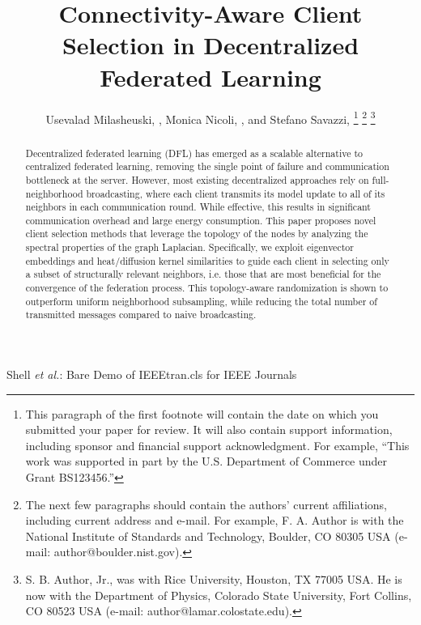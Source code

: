 \documentclass[journal]{IEEEtran}
\begin{document}
\title{Connectivity-Aware Client Selection in Decentralized Federated Learning}

\author{Usevalad Milasheuski, , Monica Nicoli, , and Stefano Savazzi, 
\thanks{This paragraph of the first footnote will contain the date on which you submitted your paper for review. It will also contain support information, including sponsor and financial support acknowledgment. For example, ``This work was supported in part by the U.S. Department of Commerce under Grant BS123456.'' }
\thanks{The next few paragraphs should contain the authors' current affiliations, including current address and e-mail. For example, F. A. Author is with the National Institute of Standards and Technology, Boulder, CO 80305 USA (e-mail: author@boulder.nist.gov).}
\thanks{S. B. Author, Jr., was with Rice University, Houston, TX 77005 USA. He is now with the Department of Physics, Colorado State University, Fort Collins, CO 80523 USA (e-mail: author@lamar.colostate.edu).}}

{Shell \MakeLowercase{\textit{et al.}}: Bare Demo of IEEEtran.cls for IEEE Journals}
\maketitle

\begin{abstract}
Decentralized federated learning (DFL) has emerged as a scalable alternative to centralized federated learning, removing the single point of failure and communication bottleneck at the server. However, most existing decentralized approaches rely on full-neighborhood broadcasting, where each client transmits its model update to all of its neighbors in each communication round. While effective, this results in significant communication overhead and large energy consumption. This paper proposes novel client selection methods that leverage the topology of the nodes by analyzing the spectral properties of the graph Laplacian. Specifically, we exploit eigenvector embeddings and heat/diffusion kernel similarities to guide each client in selecting only a subset of structurally relevant neighbors, i.e. those that are most beneficial for the convergence of the federation process. This topology-aware randomization is shown to outperform uniform neighborhood subsampling, while reducing the total number of transmitted messages compared to naive broadcasting.
\end{abstract}
\end{document}
